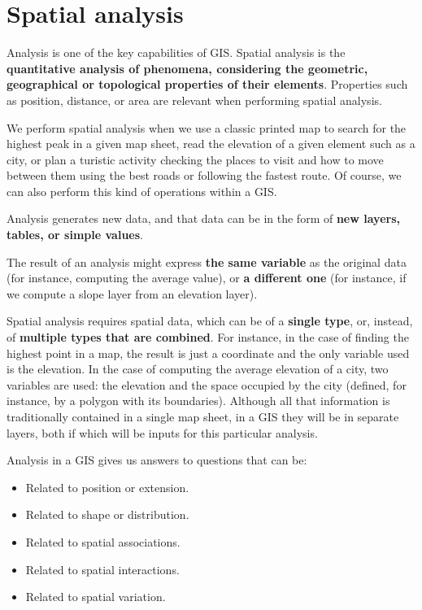 
\chapter{Spatial analysis}



\pagestyle{fancy}

Analysis is one of the key capabilities of GIS. Spatial analysis is the \textbf{quantitative analysis of phenomena, considering the geometric, geographical or topological properties of their elements}. Properties such as position, distance, or area are relevant when performing spatial analysis.

We perform spatial analysis when we use a classic printed map to search for the highest peak in a given map sheet, read the elevation of a given element such as a city, or plan a turistic activity checking the places to visit and how to move between them using the best roads or following the fastest route. Of course, we can also perform this kind of operations within a GIS.

Analysis generates new data, and that data can be in the form of \textbf{new layers, tables, or simple values}.

The result of an analysis might express \textbf{the same variable} as the original data (for instance, computing the average value), or \textbf{a different one} (for instance, if we compute a slope layer from an elevation layer).

Spatial analysis requires spatial data, which can be of a \textbf{single type}, or, instead, of \textbf{multiple types that are combined}. For instance, in the case of finding the highest point in a map, the result is just a coordinate and the only variable used is the elevation. In the case of computing the average elevation of a city, two variables are used: the elevation and the space occupied by the city (defined, for instance, by a polygon with its boundaries). Although all that information is traditionally contained in a single map sheet, in a GIS they will be in separate layers, both if which will be inputs for this particular analysis.

Analysis in a GIS gives us answers to questions that can be:

\begin{itemize}
 \item Related to position or extension.
\item Related to shape or distribution.
\item Related to spatial associations.
\item Related to spatial interactions.
\item Related to spatial variation.
\end{itemize}

